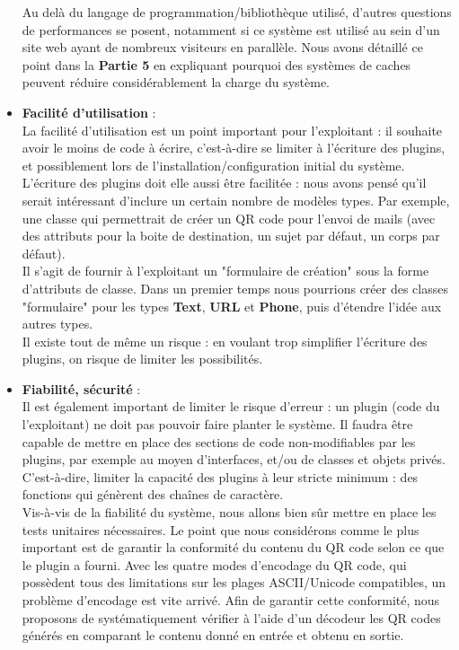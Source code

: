\documentclass[a4paper,12pt]{article}
\begin{document}
\begin{itemize}
  Au delà du langage de programmation/bibliothèque utilisé, d'autres questions de performances se posent, notamment si ce système est utilisé au sein d'un site web ayant de nombreux visiteurs en parallèle. Nous avons détaillé ce point dans la \textbf{Partie 5} en expliquant pourquoi des systèmes de caches peuvent réduire considérablement la charge du système.\\

  \item \textbf{Facilité d'utilisation} :\\
  La facilité d'utilisation est un point important pour l'exploitant : il souhaite avoir le moins de code à écrire, c'est-à-dire se limiter à l'écriture des plugins, et possiblement lors de l'installation/configuration initial du système. L'écriture des plugins doit elle aussi être facilitée : nous avons pensé qu'il serait intéressant d'inclure un certain nombre de modèles types. Par exemple, une classe qui permettrait de créer un QR code pour l'envoi de mails (avec des attributs pour la boite de destination, un sujet par défaut, un corps par défaut).\\
  
  Il s'agit de fournir à l'exploitant un "formulaire de création" sous la forme d'attributs de classe. Dans un premier temps nous pourrions créer des classes "formulaire" pour les types \textbf{Text}, \textbf{URL} et \textbf{Phone}, puis d'étendre l'idée aux autres types.\\
  
  Il existe tout de même un risque : en voulant trop simplifier l'écriture des plugins, on risque de limiter les possibilités.\\

  \item \textbf{Fiabilité, sécurité} :\\
  Il est également important de limiter le risque d'erreur : un plugin (code du l'exploitant) ne doit pas pouvoir faire planter le système. Il faudra être capable de mettre en place des sections de code non-modifiables par les plugins, par exemple au moyen d'interfaces, et/ou de classes et objets privés. C'est-à-dire, limiter la capacité des plugins à leur stricte minimum : des fonctions qui génèrent des chaînes de caractère.\\
  
  Vis-à-vis de la fiabilité du système, nous allons bien sûr mettre en place les tests unitaires nécessaires. Le point que nous considérons comme le plus important est de garantir la conformité du contenu du QR code selon ce que le plugin a fourni. Avec les quatre modes d'encodage du QR code, qui possèdent tous des limitations sur les plages ASCII/Unicode compatibles, un problème d'encodage est vite arrivé. Afin de garantir cette conformité, nous proposons de systématiquement vérifier à l'aide d'un décodeur les QR codes générés en comparant le contenu donné en entrée et obtenu en sortie.\\
  

\end{itemize}
\end{document}
